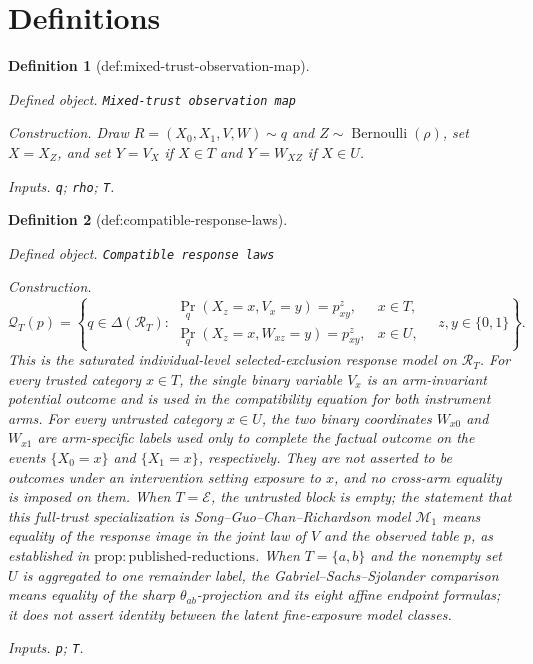 \documentclass{article}
\newtheorem{definition}{Definition}
\begin{document}
\section{Definitions}

\begin{definition}[def:mixed-trust-observation-map]\label{def:mixed-trust-observation-map}
\par\smallskip\noindent\emph{Defined object.} \texttt{Mixed-\allowbreak{}trust observation map}
\par\smallskip\noindent\emph{Construction.} Draw \(R=(X_0,X_1,V,W)\sim q\) and \(Z\sim\operatorname{Bernoulli}(\rho)\), set \(X=X_Z\), and set \(Y=V_X\) if \(X\in T\) and \(Y=W_{XZ}\) if \(X\in U\).
\par\smallskip\noindent\emph{Inputs.} \texttt{q}; \texttt{rho}; \texttt{T}.
\end{definition}

\begin{definition}[def:compatible-response-laws]\label{def:compatible-response-laws}
\par\smallskip\noindent\emph{Defined object.} \texttt{Compatible response laws}
\par\smallskip\noindent\emph{Construction.} \[
\mathcal Q_T(p)=\left\{q\in\Delta(\mathcal R_T):
\begin{array}{ll}
\Pr_q(X_z=x,V_x=y)=p^z_{xy},
  &x\in T,\\
\Pr_q(X_z=x,W_{xz}=y)=p^z_{xy},
  &x\in U,
\end{array}
\quad z,y\in\{0,1\}\right\}.
\]
This is the saturated individual-level selected-exclusion response model on \(\mathcal R_T\).  For every trusted category \(x\in T\), the single binary variable \(V_x\) is an arm-invariant potential outcome and is used in the compatibility equation for both instrument arms.  For every untrusted category \(x\in U\), the two binary coordinates \(W_{x0}\) and \(W_{x1}\) are arm-specific labels used only to complete the factual outcome on the events \(\{X_0=x\}\) and \(\{X_1=x\}\), respectively.  They are not asserted to be outcomes under an intervention setting exposure to \(x\), and no cross-arm equality is imposed on them.  When \(T=\mathcal E\), the untrusted block is empty; the statement that this full-trust specialization is Song--Guo--Chan--Richardson model \(\mathcal M_1\) means equality of the response image in the joint law of \(V\) and the observed table \(p\), as established in \(\mathrm{prop{:}published\mbox{-}reductions}\).  When \(T=\{a,b\}\) and the nonempty set \(U\) is aggregated to one remainder label, the Gabriel--Sachs--Sjolander comparison means equality of the sharp \(\theta_{ab}\)-projection and its eight affine endpoint formulas; it does not assert identity between the latent fine-exposure model classes.
\par\smallskip\noindent\emph{Inputs.} \texttt{p}; \texttt{T}.
\end{definition}
\end{document}
